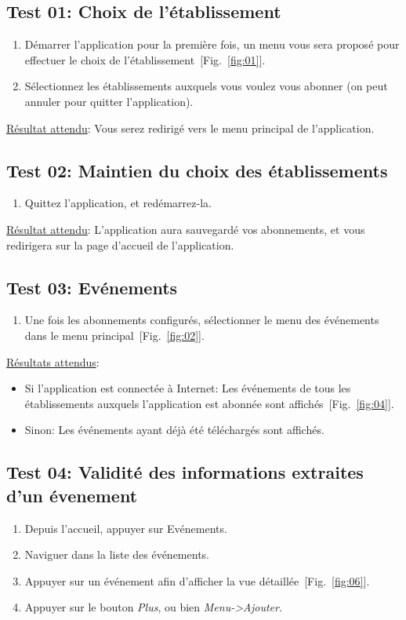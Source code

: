 \documentclass [pdftex,12pt] {report}
\begin{document}
  \subsection{Test 01: Choix de l'établissement}
    \begin{enumerate}
    \item Démarrer l'application pour la première fois, un menu vous sera proposé pour effectuer le choix de l'établissement~[Fig.~\ref{fig:01}].
    \item Sélectionnez les établissements auxquels vous voulez vous abonner (on peut annuler pour quitter l'application).
    \end{enumerate}

    \underline{Résultat attendu}: Vous serez redirigé vers le menu principal de l'application.

  \subsection{Test 02: Maintien du choix des établissements}
    \begin{enumerate}
    \item Quittez l'application, et redémarrez-la.
    \end{enumerate}

    \underline{Résultat attendu}: L'application aura sauvegardé vos abonnements, et vous redirigera sur la page d'accueil de l'application.

  \subsection{Test 03: Evénements}
    \begin{enumerate}
    \item Une fois les abonnements configurés, sélectionner le menu des événements dans le menu principal~[Fig.~\ref{fig:02}].
    \end{enumerate}

    \underline{Résultats attendus}:
    \begin{itemize}
    \item Si l'application est connectée à Internet: Les événements de tous les établissements auxquels l'application est abonnée sont affichés~[Fig.~\ref{fig:04}].
    \item Sinon: Les événements ayant déjà été téléchargés sont affichés.
    \end{itemize}

  \subsection{Test 04: Validité des informations extraites d'un évenement}
    \begin{enumerate}
    \item Depuis l'accueil, appuyer sur Evénements.
    \item Naviguer dans la liste des événements.
    \item Appuyer sur un événement afin d'afficher la vue détaillée~[Fig.~\ref{fig:06}].
    \item Appuyer sur le bouton \emph{Plus}, ou bien \emph{Menu->Ajouter}.
    \end{enumerate}
\end{document}
